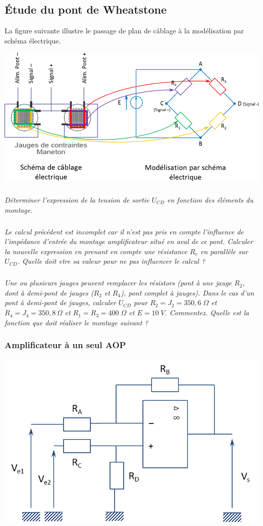 \documentclass[10pt]{article}
\begin{document}
\subsection*{Étude du pont de Wheatstone}

La figure suivante illustre le passage de plan de câblage à la modélisation par schéma électrique. 

\begin{center}
\includegraphics[width=.75\textwidth]{images/cablage}
\end{center}


\subparagraph{}
\textit{Déterminer l'expression de la tension de sortie $U_{CD}$ en fonction des éléments du montage.}


\subparagraph{}
\textit{Le calcul précédent est incomplet car il n'est pas pris en compte l'influence de l'impédance d'entrée du montage amplificateur situé en aval de ce pont. Calculer la nouvelle expression en prenant en compte une résistance $R_e$ en parallèle sur $U_{CD}$. Quelle doit etre sa valeur pour ne pas influencer le calcul ? }

\subparagraph{}
\textit{Une ou plusieurs jauges peuvent remplacer les résistors (pont à une jauge $R_2$, dont à demi-pont de jauges ($R_2$ et $R_4$), pont complet à jauges). Dans le cas d'un pont à demi-pont de jauges, calculer $U_{CD}$ pour $R_2 = J_2 = 350,6\; \Omega$ et $R_4 = J_4 = 350,8 \, \Omega$ et $R_1=R_3=400\; \Omega$ et $E=10\; V$. Commentez. Quelle est la fonction que doit réaliser le montage suivant ?}


\subsubsection*{Amplificateur à un seul AOP}

\begin{center}
\includegraphics[width=.75\textwidth]{images/AO1}
\end{center}
\end{document}
